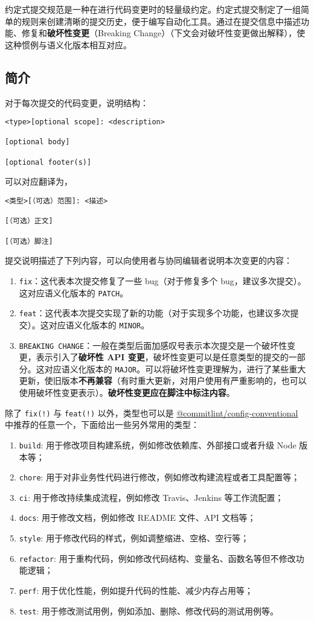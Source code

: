 

约定式提交规范是一种在进行代码变更时的轻量级约定。约定式提交制定了一组简单的规则来创建清晰的提交历史，便于编写自动化工具。通过在提交信息中描述功能、修复和\textbf{破坏性变更}（Breaking Change）（下文会对破坏性变更做出解释），使这种惯例与语义化版本相互对应。

\subsection{简介}
对于每次提交的代码变更，说明结构：
\begin{lstlisting}[language=none]
<type>[optional scope]: <description>

[optional body]

[optional footer(s)]
\end{lstlisting}
可以对应翻译为，
\begin{lstlisting}[language=none]
<类型>[（可选）范围]: <描述>

[（可选）正文]

[（可选）脚注]
\end{lstlisting}
提交说明描述了下列内容，可以向使用者与协同编辑者说明本次变更的内容：
\begin{enumerate}
\item \verb`fix`：这代表本次提交修复了一些 bug（对于修复多个 bug，建议多次提交）。这对应语义化版本的 \verb`PATCH`。
\item \verb`feat`：这代表本次提交实现了新的功能（对于实现多个功能，也建议多次提交）。这对应语义化版本的 \verb`MINOR`。
\item \verb`BREAKING CHANGE`：一般在类型后面加感叹号表示本次提交是一个破坏性变更，表示引入了\textbf{破坏性 API 变更}，破坏性变更可以是任意类型的提交的一部分。这对应语义化版本的 \verb`MAJOR`。可以将破坏性变更理解为，进行了某些重大更新，使旧版本\textbf{不再兼容}（有时重大更新，对用户使用有严重影响的，也可以使用破坏性变更表示）。\textbf{破坏性变更应在脚注中标注内容}。
\end{enumerate}
除了 \verb`fix(!)` 与 \verb`feat(!)` 以外，类型也可以是 \href{https://github.com/conventional-changelog/commitlint/tree/master/\%2540commitlint/config-conventional}{@commitlint/config-conventional} 中推荐的任意一个，下面给出一些另外常用的类型：
\begin{enumerate}
\item \verb`build`: 用于修改项目构建系统，例如修改依赖库、外部接口或者升级 Node 版本等；
\item \verb`chore`: 用于对非业务性代码进行修改，例如修改构建流程或者工具配置等；
\item \verb`ci`: 用于修改持续集成流程，例如修改 Travis、Jenkins 等工作流配置；
\item \verb`docs`: 用于修改文档，例如修改 README 文件、API 文档等；
\item \verb`style`: 用于修改代码的样式，例如调整缩进、空格、空行等；
\item \verb`refactor`: 用于重构代码，例如修改代码结构、变量名、函数名等但不修改功能逻辑；
\item \verb`perf`: 用于优化性能，例如提升代码的性能、减少内存占用等；
\item \verb`test`: 用于修改测试用例，例如添加、删除、修改代码的测试用例等。
\end{enumerate}
